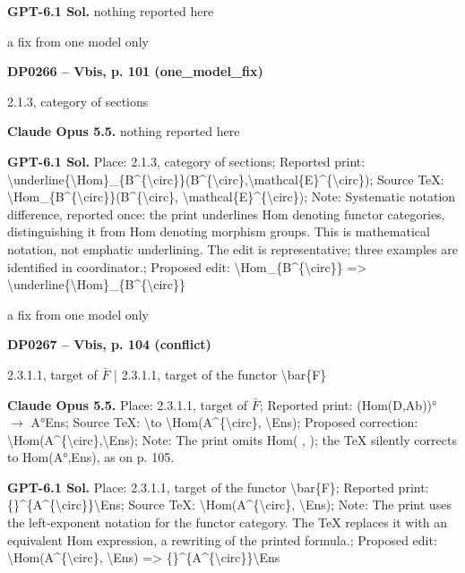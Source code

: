 \textbf{GPT-6.1 Sol.} nothing reported here\par
a fix from one model only\par
\par\noindent\hypertarget{DP0266}{}\textbf{DP0266 -- Vbis, p. 101 (one\_model\_fix)}\par
2.1.3, category of sections\par
\textbf{Claude Opus 5.5.} nothing reported here\par
\textbf{GPT-6.1 Sol.} Place: 2.1.3, category of sections; Reported print: \textbackslash{}underline\{\textbackslash{}Hom\}\_\{B\textasciicircum{}\{\textbackslash{}circ\}\}(B\textasciicircum{}\{\textbackslash{}circ\},\textbackslash{}mathcal\{E\}\textasciicircum{}\{\textbackslash{}circ\}); Source TeX: \textbackslash{}Hom\_\{B\textasciicircum{}\{\textbackslash{}circ\}\}(B\textasciicircum{}\{\textbackslash{}circ\}, \textbackslash{}mathcal\{E\}\textasciicircum{}\{\textbackslash{}circ\}); Note: Systematic notation difference, reported once: the print underlines Hom denoting functor categories, distinguishing it from Hom denoting morphism groups. This is mathematical notation, not emphatic underlining. The edit is representative; three examples are identified in coordinator.; Proposed edit: \textbackslash{}Hom\_\{B\textasciicircum{}\{\textbackslash{}circ\}\} =\allowbreak > \textbackslash{}underline\{\textbackslash{}Hom\}\_\{B\textasciicircum{}\{\textbackslash{}circ\}\}\par
a fix from one model only\par
\par\noindent\hypertarget{DP0267}{}\textbf{DP0267 -- Vbis, p. 104 (conflict)}\par
2.3.1.1, target of \ensuremath{\bar{F}} | 2.3.1.1, target of the functor \textbackslash{}bar\{F\}\par
\textbf{Claude Opus 5.5.} Place: 2.3.1.1, target of \ensuremath{\bar{F}}; Reported print: (Hom(D,Ab))° \ensuremath{\to} A°Ens; Source TeX: \textbackslash{}to \textbackslash{}Hom(A\textasciicircum{}\{\textbackslash{}circ\}, \textbackslash{}Ens); Proposed correction: \textbackslash{}Hom(A\textasciicircum{}\{\textbackslash{}circ\},\textbackslash{}Ens); Note: The print omits Hom( , ); the TeX silently corrects to Hom(A°,Ens), as on p. 105.\par
\textbf{GPT-6.1 Sol.} Place: 2.3.1.1, target of the functor \textbackslash{}bar\{F\}; Reported print: \{\}\textasciicircum{}\{A\textasciicircum{}\{\textbackslash{}circ\}\}\textbackslash{}Ens; Source TeX: \textbackslash{}Hom(A\textasciicircum{}\{\textbackslash{}circ\}, \textbackslash{}Ens); Note: The print uses the left-exponent notation for the functor category. The TeX replaces it with an equivalent Hom expression, a rewriting of the printed formula.; Proposed edit: \textbackslash{}Hom(A\textasciicircum{}\{\textbackslash{}circ\}, \textbackslash{}Ens) =\allowbreak > \{\}\textasciicircum{}\{A\textasciicircum{}\{\textbackslash{}circ\}\}\textbackslash{}Ens\par
